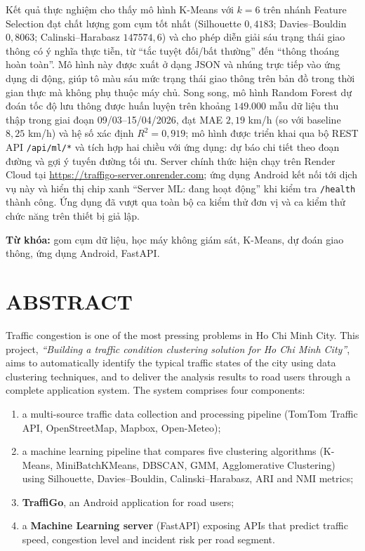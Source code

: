 \documentclass[12pt,a4paper]{report}
\begin{document}
Kết quả thực nghiệm cho thấy mô hình K-Means với $k=6$ trên nhánh Feature Selection đạt chất lượng gom cụm tốt nhất (Silhouette $0{,}4183$; Davies--Bouldin $0{,}8063$; Calinski--Harabasz $147574{,}6$) và cho phép diễn giải sáu trạng thái giao thông có ý nghĩa thực tiễn, từ ``tắc tuyệt đối/bất thường'' đến ``thông thoáng hoàn toàn''. Mô hình này được xuất ở dạng JSON và nhúng trực tiếp vào ứng dụng di động, giúp tô màu sáu mức trạng thái giao thông trên bản đồ trong thời gian thực mà không phụ thuộc máy chủ. Song song, mô hình Random Forest dự đoán tốc độ lưu thông được huấn luyện trên khoảng $149.000$ mẫu dữ liệu thu thập trong giai đoạn 09/03--15/04/2026, đạt MAE $2{,}19$ km/h (so với baseline $8{,}25$ km/h) và hệ số xác định $R^2 = 0{,}919$; mô hình được triển khai qua bộ REST API \texttt{/api/ml/*} và tích hợp hai chiều với ứng dụng: dự báo chi tiết theo đoạn đường và gợi ý tuyến đường tối ưu. Server chính thức hiện chạy trên Render Cloud tại \url{https://traffigo-server.onrender.com}; ứng dụng Android kết nối tới dịch vụ này và hiển thị chip xanh ``Server ML: đang hoạt động'' khi kiểm tra \texttt{/health} thành công. Ứng dụng đã vượt qua toàn bộ ca kiểm thử đơn vị và ca kiểm thử chức năng trên thiết bị giả lập.

\textbf{Từ khóa:} gom cụm dữ liệu, học máy không giám sát, K-Means, dự đoán giao thông, ứng dụng Android, FastAPI.

\chapter*{ABSTRACT}

Traffic congestion is one of the most pressing problems in Ho Chi Minh City. This project, \textit{``Building a traffic condition clustering solution for Ho Chi Minh City''}, aims to automatically identify the typical traffic states of the city using data clustering techniques, and to deliver the analysis results to road users through a complete application system. The system comprises four components:
\begin{enumerate}[label=(\roman*),leftmargin=2.2cm,itemsep=2pt]
    \item a multi-source traffic data collection and processing pipeline (TomTom Traffic API, OpenStreetMap, Mapbox, Open-Meteo);
    \item a machine learning pipeline that compares five clustering algorithms (K-Means, MiniBatchKMeans, DBSCAN, GMM, Agglomerative Clustering) using Silhouette, Davies--Bouldin, Calinski--Harabasz, ARI and NMI metrics;
    \item \textbf{TraffiGo}, an Android application for road users;
    \item a \textbf{Machine Learning server} (FastAPI) exposing APIs that predict traffic speed, congestion level and incident risk per road segment.
\end{enumerate}
\end{document}
